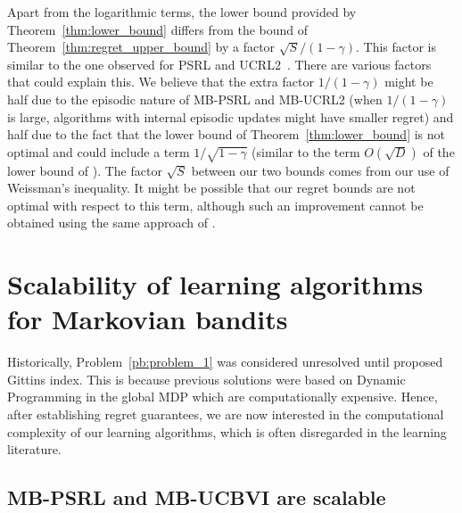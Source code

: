 Apart from the logarithmic terms, the lower bound provided by Theorem~\ref{thm:lower_bound} differs from the bound of Theorem~\ref{thm:regret_upper_bound} by a factor $\sqrt{S}/(1-\gamma)$. This factor is similar to the one observed for PSRL and UCRL2~\cite{osband2013more,jaksch2010near}. There are various factors that could explain this. We believe that the extra factor  $1/(1-\gamma)$ might be half due to the episodic nature of MB-PSRL and MB-UCRL2 (when $1/(1-\gamma)$ is large, algorithms with internal episodic updates might have smaller regret) and half due to the fact that the lower bound of Theorem~\ref{thm:lower_bound} is not optimal and could include a term $1/\sqrt{1-\gamma}$ (similar to the term $O(\sqrt{D})$ of the lower bound of \cite{osband2016lower,jaksch2010near}). The factor $\sqrt{S}$ between our two bounds comes from our use of Weissman's inequality. It might be possible that our regret bounds  are not optimal with respect to this term, although such an improvement cannot be obtained using the same approach of \cite{azar2017minimax}.

\section{Scalability of learning algorithms for Markovian bandits}
\label{ch:rested:scale}

Historically, Problem~{\ref{pb:problem_1}} was considered unresolved until \cite{gittins1979bandit} proposed Gittins index. This is because previous solutions were based on Dynamic Programming in the global MDP which are computationally expensive. Hence, after establishing regret guarantees, we are now interested in the computational complexity of our learning algorithms, which is often disregarded in the learning literature.

\subsection{MB-PSRL and MB-UCBVI are scalable}

